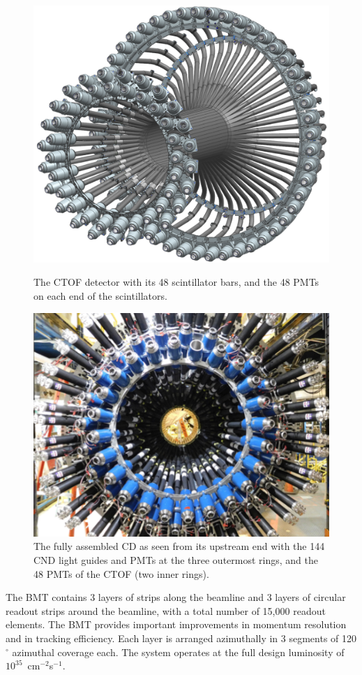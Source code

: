 \documentclass[final,3p,twocolumn]{elsarticle}
\begin{document}
\begin{figure}[t!]
\includegraphics[width=1.0\columnwidth]{ctof-design.png}
\caption{The CTOF detector with its 48 scintillator bars, and the 48 PMTs on each end of the scintillators.}
\label{ctof} 
\vspace{0.5cm}\centerline{\includegraphics[width=0.9\columnwidth]{cnd-ctof.png}}
\caption{The fully assembled CD as seen from its upstream end with the 144 CND light guides and PMTs at the
  three outermost rings, and the 48 PMTs of the CTOF (two inner rings).} 
\label{ctof-cnd}
\end{figure} 
The BMT contains 3 layers of strips along the beamline and 3 layers of circular readout strips around the beamline,
with a total number of 15,000 readout elements. The BMT provides important improvements in momentum resolution
and in tracking efficiency. Each layer is arranged azimuthally in 3 segments of 120$^\circ$ azimuthal coverage each. The
system operates at the full design luminosity of $10^{35}$~cm$^{-2}$s$^{-1}$.
\end{document}
